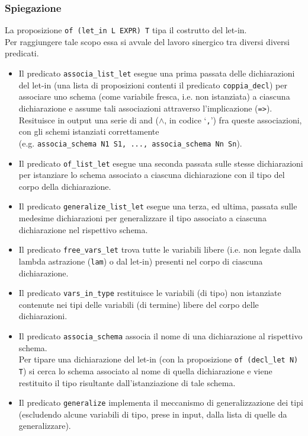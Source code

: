 \documentclass[12pt,a4paper,openright,twoside]{report}
\begin{document}
\subsubsection{Spiegazione}
La proposizione \verb"of (let_in L EXPR) T" tipa il costrutto del let-in.\\
Per raggiungere tale scopo essa si avvale del lavoro sinergico tra diversi diversi predicati.
\begin{itemize}
 \item Il predicato \verb"associa_list_let" esegue una prima passata delle dichiarazioni del let-in (una lista di proposizioni contenti il predicato \verb"coppia_decl") per associare uno schema (come variabile fresca, i.e. non istanziata) a ciascuna dichiarazione e assume tali associazioni attraverso l'implicazione (\verb"=>").\\
 Resituisce in output una serie di and ($\wedge$, in codice `\verb","') fra queste associazioni, con gli schemi istanziati correttamente\\
 (e.g. \verb"associa_schema N1 S1, ..., associa_schema Nn Sn").
 \item Il predicato \verb"of_list_let" esegue una seconda passata sulle stesse dichiarazioni per istanziare lo schema associato a ciascuna dichiarazione con il tipo del corpo della dichiarazione.
 \item Il predicato \verb"generalize_list_let" esegue una terza, ed ultima, passata sulle medesime dichiarazioni per generalizzare il tipo associato a ciascuna dichiarazione nel rispettivo schema.
 \item Il predicato \verb"free_vars_let" trova tutte le variabili libere (i.e. non legate dalla lambda astrazione (\verb"lam") o dal let-in) presenti nel corpo di ciascuna dichiarazione.
 \item Il predicato \verb"vars_in_type" restituisce le variabili (di tipo) non istanziate contenute nei tipi delle variabili (di termine) libere del corpo delle dichiarazioni.
 \item Il predicato \verb"associa_schema" associa il nome di una dichiarazione al rispettivo schema.\\
 Per tipare una dichiarazione del let-in (con la proposizione \verb"of (decl_let N) T") si cerca lo schema associato al nome di quella dichiarazione e viene restituito il tipo risultante dall'istanziazione di tale schema.
 \item Il predicato \verb"generalize" implementa il meccanismo di generalizzazione dei tipi (escludendo alcune variabili di tipo, prese in input, dalla lista di quelle da generalizzare).

\end{itemize}
\end{document}
